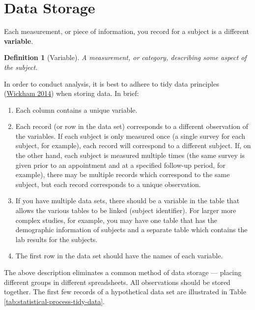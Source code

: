 \documentclass[
]{book}
\theoremstyle{plain}
\theoremstyle{mydefn}
\newtheorem{definition}{Definition}[chapter]
\theoremstyle{myexmpl}
\theoremstyle{remark}
\begin{document}
\hypertarget{data-storage}{%
\section{Data Storage}\label{data-storage}}

Each measurement, or piece of information, you record for a subject is a different \textbf{variable}.

\begin{definition}[Variable]
A measurement, or category, describing some aspect of the subject.
\end{definition}

In order to conduct analysis, it is best to adhere to tidy data principles (\protect\hyperlink{ref-Wickham2014}{Wickham 2014}) when storing data. In brief:

\begin{enumerate}
\def\labelenumi{\arabic{enumi}.}
\item
  Each column contains a unique variable.
\item
  Each record (or row in the data set) corresponds to a different observation of the variables. If each subject is only measured once (a single survey for each subject, for example), each record will correspond to a different subject. If, on the other hand, each subject is measured multiple times (the same survey is given prior to an appointment and at a specified follow-up period, for example), there may be multiple records which correspond to the same subject, but each record corresponds to a unique observation.
\item
  If you have multiple data sets, there should be a variable in the table that allows the various tables to be linked (subject identifier). For larger more complex studies, for example, you may have one table that has the demographic information of subjects and a separate table which contains the lab results for the subjects.
\item
  The first row in the data set should have the names of each variable.
\end{enumerate}

The above description eliminates a common method of data storage --- placing different groups in different spreadsheets. All observations should be stored together. The first few records of a hypothetical data set are illustrated in Table \ref{tab:statistical-process-tidy-data}.
\end{document}
